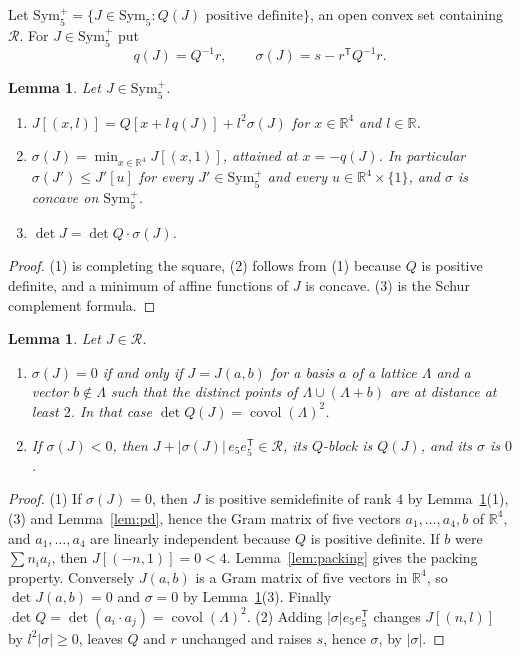 \documentclass[11pt]{amsart}
\newtheorem{lemma}[theorem]{Lemma}
\theoremstyle{definition}
\theoremstyle{remark}
\numberwithin{equation}{section}
\numberwithin{table}{section}
\numberwithin{figure}{section}
\newcommand{\R}{\mathbb{R}}
\newcommand{\Rk}{\mathcal{R}}
\newcommand{\Sym}{\mathrm{Sym}}
\newcommand{\covol}{\operatorname{covol}}
\begin{document}
Let $\Sym_5^+=\{J\in\Sym_5:Q(J)\text{ positive definite}\}$, an open convex set containing $\Rk$. For $J\in\Sym_5^+$ put
\[
q(J)=Q^{-1}r,\qquad \sigma(J)=s-r^{\mathsf T}Q^{-1}r .
\]

\begin{lemma}\label{lem:sigma}
Let $J\in\Sym_5^+$.
\begin{enumerate}
\item $J[(x,l)]=Q[x+l\,q(J)]+l^2\sigma(J)$ for $x\in\R^4$ and $l\in\R$.
\item $\sigma(J)=\min_{x\in\R^4}J[(x,1)]$, attained at $x=-q(J)$. In particular $\sigma(J')\le J'[u]$ for every $J'\in\Sym_5^+$ and every $u\in\R^4\times\{1\}$, and $\sigma$ is concave on $\Sym_5^+$.
\item $\det J=\det Q\cdot\sigma(J)$.
\end{enumerate}
\end{lemma}

\begin{proof}
(1) is completing the square, (2) follows from (1) because $Q$ is positive definite, and a minimum of affine functions of $J$ is concave. (3) is the Schur complement formula.
\end{proof}

\begin{lemma}\label{lem:rank4}
Let $J\in\Rk$.
\begin{enumerate}
\item $\sigma(J)=0$ if and only if $J=J(a,b)$ for a basis $a$ of a lattice $\Lambda$ and a vector $b\notin\Lambda$ such that the distinct points of $\Lambda\cup(\Lambda+b)$ are at distance at least $2$. In that case $\det Q(J)=\covol(\Lambda)^2$.
\item If $\sigma(J)<0$, then $J+|\sigma(J)|\,e_5e_5^{\mathsf T}\in\Rk$, its $Q$-block is $Q(J)$, and its $\sigma$ is $0$.
\end{enumerate}
\end{lemma}

\begin{proof}
(1) If $\sigma(J)=0$, then $J$ is positive semidefinite of rank $4$ by Lemma~\ref{lem:sigma}(1), (3) and Lemma~\ref{lem:pd}, hence the Gram matrix of five vectors $a_1,\dots,a_4,b$ of $\R^4$, and $a_1,\dots,a_4$ are linearly independent because $Q$ is positive definite. If $b$ were $\sum n_ia_i$, then $J[(-n,1)]=0<4$. Lemma~\ref{lem:packing} gives the packing property. Conversely $J(a,b)$ is a Gram matrix of five vectors in $\R^4$, so $\det J(a,b)=0$ and $\sigma=0$ by Lemma~\ref{lem:sigma}(3). Finally $\det Q=\det(a_i\cdot a_j)=\covol(\Lambda)^2$.
(2) Adding $|\sigma|e_5e_5^{\mathsf T}$ changes $J[(n,l)]$ by $l^2|\sigma|\ge0$, leaves $Q$ and $r$ unchanged and raises $s$, hence $\sigma$, by $|\sigma|$.
\end{proof}
\end{document}

